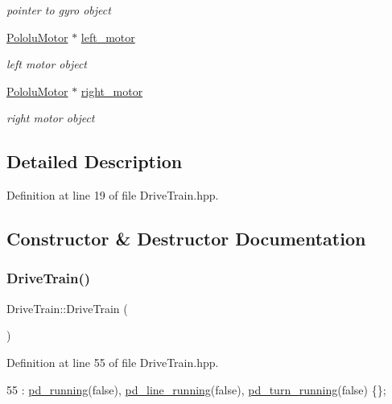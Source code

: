 \begin{DoxyCompactItemize}
\begin{DoxyCompactList}\small\item\em pointer to gyro object \end{DoxyCompactList}\item 
\hyperlink{class_pololu_motor}{Pololu\+Motor} $\ast$ \hyperlink{class_drive_train_a9532e0208bfc16c308dafe08ba0e1087}{left\+\_\+motor}
\begin{DoxyCompactList}\small\item\em left motor object \end{DoxyCompactList}\item 
\hyperlink{class_pololu_motor}{Pololu\+Motor} $\ast$ \hyperlink{class_drive_train_a499c068ddd578679ac5d654e2077fbc4}{right\+\_\+motor}
\begin{DoxyCompactList}\small\item\em right motor object \end{DoxyCompactList}\end{DoxyCompactItemize}


\subsection{Detailed Description}


Definition at line 19 of file Drive\+Train.\+hpp.



\subsection{Constructor \& Destructor Documentation}
\mbox{\label{class_drive_train_a90af56eee49c93d5b7d77065b42f660b}} 
\subsubsection{\texorpdfstring{Drive\+Train()}{DriveTrain()}}
{\footnotesize\ttfamily Drive\+Train\+::\+Drive\+Train (\begin{DoxyParamCaption}{ }\end{DoxyParamCaption})\hspace{0.3cm}{\ttfamily [inline]}}



Definition at line 55 of file Drive\+Train.\+hpp.


\begin{DoxyCode}
55 : \hyperlink{class_drive_train_a24c0d92ca340c9afda1544f6ab67ea11}{pd\_running}(\textcolor{keyword}{false}), \hyperlink{class_drive_train_aaf576007439966ed66f0d91a2121a332}{pd\_line\_running}(\textcolor{keyword}{false}),  
      \hyperlink{class_drive_train_afc2305d5c7646a92d9875973ff2f7e67}{pd\_turn\_running}(\textcolor{keyword}{false}) \{\};
\end{DoxyCode}
\mbox{\label{class_drive_train_a5dd1c80e30d87655b22974431b16afdf}} 
